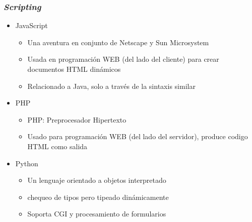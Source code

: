 \documentclass[11pt]{article}
\begin{document}
\subsubsection*{\emph{Scripting}}
\label{sec:orgheadline101}
\begin{itemize}
\item JavaScript
\begin{itemize}
\item Una aventura en conjunto de Netscape y Sun Microsystem
\item Usada en programación WEB (del lado del cliente) para crear
documentos HTML dinámicos
\item Relacionado a Java, solo a través de la sintaxis similar
\end{itemize}
\item PHP
\begin{itemize}
\item PHP: Preprocesador Hipertexto
\item Usado para programación WEB (del lado del servidor), produce
codigo HTML como salida
\end{itemize}
\item Python
\begin{itemize}
\item Un lenguaje orientado a objetos interpretado
\item chequeo de tipos pero tipeado dinámicamente
\item Soporta CGI y procesamiento de formularios
\end{itemize}
\end{itemize}
\end{document}
